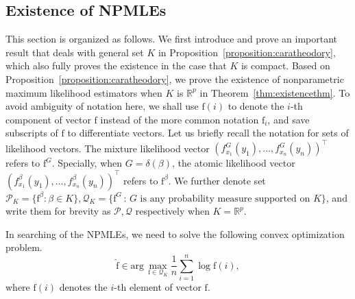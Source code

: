 \documentclass[11pt]{article}
\numberwithin{equation}{section}
\newcommand{\RS}{\mathbb{R}}
\newcommand{\PS}{\mathcal{P}}
\newcommand{\QS}{\mathcal{Q}}
\newcommand{\T}{ \top }
\newcommand{\fv}{\mathrm{f}}
\begin{document}
  



\newpage
\begin{appendices}

\section{Existence of NPMLEs}

This section is organized as follows. We first introduce and prove an important result that deals with general set $K$ in Proposition~\ref{proposition:caratheodory}, which also fully proves the existence in the case that $K$ is compact. Based on Proposition~\ref{proposition:caratheodory}, we prove the existence of nonparametric maximum likelihood estimators when $K$ is $\RS^p$ in Theorem~\ref{thm:existencethm}. To avoid ambiguity of notation here, we shall use $\fv(i)$ to denote the $i$-th component of vector $\fv$ instead of the more common notation $\fv_i$, and save subscripts of $\fv$ to differentiate vectors. Let us briefly recall the notation for sets of likelihood vectors. The mixture likelihood vector $(f^G_{x_1}(y_1),\dots,f^G_{x_n}(y_n))^\T$ refers to $\fv^G $. Specially, when $G = \delta(\beta)$, the atomic likelihood vector $(f^\beta_{x_1}(y_1), \dots, f^\beta_{x_n}(y_n))^\T$ refers to $\fv^\beta$. We further denote set $\PS_K = \{ \fv^\beta:\beta \in K \}, \QS_K=\{\fv^G \,:\, G \text{ is any probability measure supported on } K\}$, and write them for brevity as $\PS,\QS$ respectively when $K = \RS^p$.

In searching of the NPMLEs, we need to solve the following convex optimization problem.
\begin{equation}
\hat{\fv} \in \mathrm{arg}\, \underset{\fv \in \QS_K}{\max} \frac{1}{n} \sum_{i=1}^n \log \fv(i),
\label{eq:npmle_opt_fv}
\end{equation}
where $\fv(i)$ denotes the $i$-th element of vector $\fv$.



\end{appendices}
\end{document}
